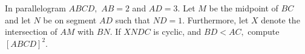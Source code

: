 In parallelogram $ABCD,$ $AB=2$ and $AD=3.$ Let $M$ be the midpoint of $BC$ and let $N$ be on segment $AD$ such that $ND=1.$ Furthermore, let $X$ denote the intersection of $AM$ with $BN.$ If $XNDC$ is cyclic, and $BD<AC,$ compute $[ABCD]^2.$
